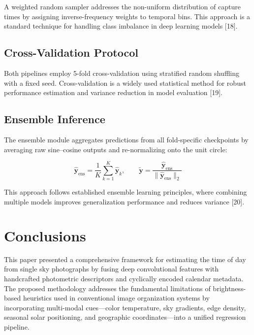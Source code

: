\documentclass[9pt, a4paper, twocolumn]{article}
\begin{document}
A weighted random sampler addresses the non-uniform distribution of capture times by assigning inverse-frequency weights to temporal bins. This approach is a standard technique for handling class imbalance in deep learning models [18].

\subsection{Cross-Validation Protocol}

Both pipelines employ 5-fold cross-validation using stratified random shuffling with a fixed seed. Cross-validation is a widely used statistical method for robust performance estimation and variance reduction in model evaluation [19].

\subsection{Ensemble Inference}

The ensemble module aggregates predictions from all fold-specific checkpoints by averaging raw sine--cosine outputs and re-normalizing onto the unit circle:

\begin{equation}
\hat{\mathbf{y}}_{\text{ens}} = \frac{1}{K} \sum_{k=1}^{K}
    \hat{\mathbf{y}}_k, \qquad
\tilde{\mathbf{y}} = \frac{\hat{\mathbf{y}}_{\text{ens}}}
    {\|\hat{\mathbf{y}}_{\text{ens}}\|_2}
\end{equation}

This approach follows established ensemble learning principles, where combining multiple models improves generalization performance and reduces variance [20].
\section{Conclusions}

This paper presented a comprehensive framework for estimating the time of day from single sky photographs by fusing deep convolutional features with handcrafted photometric descriptors and cyclically encoded calendar metadata. The proposed methodology addresses the fundamental limitations of brightness-based heuristics used in conventional image organization systems by incorporating multi-modal cues---color temperature, sky gradients, edge density, seasonal solar positioning, and geographic coordinates---into a unified regression pipeline.
\end{document}
